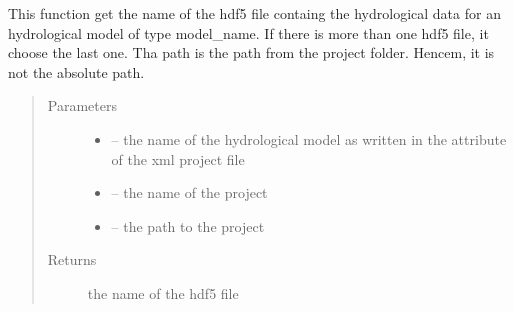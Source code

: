 \documentclass[letterpaper,10pt,english]{sphinxmanual}
\begin{document}
\begin{fulllineitems}
\label{\detokenize{index:src.load_hdf5.get_hdf5_name}}
This function get the name of the hdf5 file containg the hydrological data for an hydrological model of type
model\_name. If there is more than one hdf5 file, it choose the last one. Tha path is the path from the
project folder. Hencem, it is not the absolute path.
\begin{quote}\begin{description}
\item[{Parameters}] \leavevmode\begin{itemize}
\item {} 
 -- the name of the hydrological model as written in the attribute of the xml project file

\item {} 
 -- the name of the project

\item {} 
 -- the path to the project

\end{itemize}

\item[{Returns}] \leavevmode
the name of the hdf5 file

\end{description}\end{quote}

\end{fulllineitems}

\end{document}
